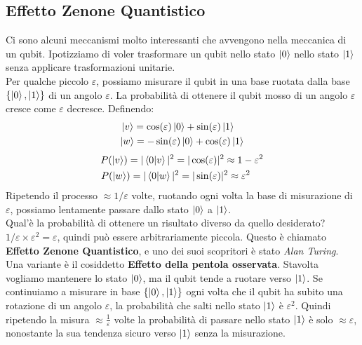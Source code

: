 \documentclass{article}
\begin{document}
    \subsection{Effetto Zenone Quantistico}
    Ci sono alcuni meccanismi molto interessanti che avvengono nella meccanica di un qubit. Ipotizziamo di voler trasformare un qubit nello stato $\ket{0}$ nello stato $\ket{1}$ senza applicare trasformazioni unitarie.
    \\ Per qualche piccolo $\varepsilon$, possiamo misurare il qubit in una base ruotata dalla base $\{\ket{0},\ket{1}\}$ di un angolo $\varepsilon$. La probabilità di ottenere il qubit mosso di un angolo $\varepsilon$ cresce come $\varepsilon$ decresce. Definendo:
    \[
    \begin{split}
    \ket{v} = \cos(\varepsilon) \ket{0} + \sin(\varepsilon)\ket{1} \ \ \ 
    \\ \ket{w} = -\sin(\varepsilon)\ket{0} +\cos(\varepsilon)\ket{1}
    \end{split}
    \]
    \[
    \begin{split}
        P(\ket{v}) = |\braket{0|v}|^2 = |\cos(\varepsilon)|^2 \approx 1 - \varepsilon^2
        \\ P(\ket{w}) = |\braket{0|w}|^2 = |\sin(\varepsilon)|^2 \approx \varepsilon^2 \ \ \ \ 
    \end{split}
    \]
    Ripetendo il processo $\approx 1/\varepsilon$ volte, ruotando ogni volta la base di misurazione di $\varepsilon$, possiamo lentamente passare dallo stato $\ket{0}$ a $\ket{1}$.
    \\Qual'è la probabilità di ottenere un risultato diverso da quello desiderato? $1/\varepsilon \times \varepsilon^2 = \varepsilon$, quindi può essere arbitrariamente piccola. Questo è chiamato \textbf{Effetto Zenone Quantistico}, e uno dei suoi scopritori è stato \textit{Alan Turing}.
    \medskip
    \\ Una variante è il cosiddetto \textbf{Effetto della pentola osservata}. Stavolta vogliamo mantenere lo stato $\ket{0}$, ma il qubit tende a ruotare verso $\ket{1}$. Se continuiamo a misurare in base $\{\ket{0},\ket{1}\}$ ogni volta che il qubit ha subito una rotazione di un angolo $\varepsilon$, la probabilità che salti nello stato $\ket{1}$ è $\varepsilon^2$. Quindi ripetendo la misura $ \approx\frac{1}{\varepsilon}$ volte la probabilità di passare nello stato $\ket{1}$ è solo $ \approx \varepsilon$, nonostante la sua tendenza sicuro verso $\ket{1}$ senza la misurazione.
\end{document}
